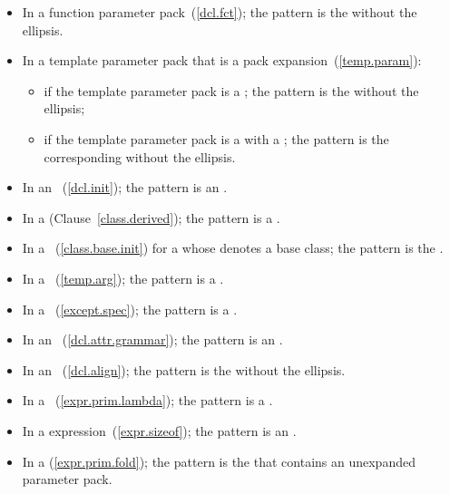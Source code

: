 \begin{itemize}
\item In a function parameter pack~(\ref{dcl.fct}); the pattern is the
 without the ellipsis.

\item In a template parameter pack that is a pack expansion~(\ref{temp.param}):

\begin{itemize}
\item if the template parameter pack is a ;
the pattern is the  without the ellipsis;

\item if the template parameter pack is a  with a
; the pattern is the corresponding
 without the ellipsis.
\end{itemize}

\item In an ~(\ref{dcl.init});
the pattern is an .

\item In a  (Clause~\ref{class.derived});
the pattern is a .

\item In a ~(\ref{class.base.init}) for a
 whose  denotes a
base class; the pattern is the .

\item In a ~(\ref{temp.arg});
the pattern is a .

\item In a ~(\ref{except.spec});
the pattern is a .

\item In an ~(\ref{dcl.attr.grammar}); the pattern is
an .

\item In an ~(\ref{dcl.align}); the pattern is
the  without the ellipsis.

\item In a ~(\ref{expr.prim.lambda}); the pattern is
a .

\item In a  expression~(\ref{expr.sizeof}); the pattern is an
.

\item In a  (\ref{expr.prim.fold});
the pattern is the 
that contains an unexpanded parameter pack.
\end{itemize}

